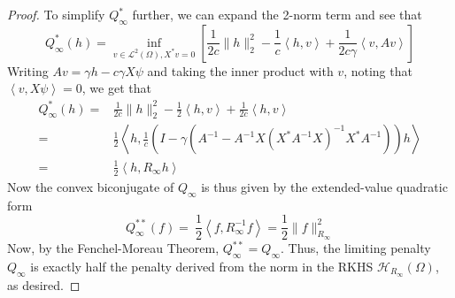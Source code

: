\documentclass[ejsv2,preprint]{imsart}
\newcommand{\inprod}[2]{\left\langle #1,#2\right\rangle}
\begin{document}
\begin{proof}
To simplify $Q^*_\infty$ further, we can expand the 2-norm term and see that
\begin{equation}
    Q^*_\infty(h) = \underset{v\in \mathcal{L}^2(\Omega), X^*v=0}{\inf} \left[\frac{1}{2c}\|h\|_2^2-\frac{1}{c}\inprod{h}{v}+\frac{1}{2c\gamma}\inprod{v}{Av}\right]
\end{equation}
Writing $Av=\gamma h-c\gamma X\psi$ and taking the inner product with $v$, noting that $\inprod{v}{X\psi}=0$, we get that
\begin{equation}
\begin{split}
    Q^*_\infty(h) =& \frac{1}{2c}\|h\|_2^2-\frac{1}{2}\inprod{h}{v}+\frac{1}{2c}\inprod{h}{v} \\
    =&\frac{1}{2}\inprod{h}{\frac{1}{c}
    \left(I-\gamma\left(A^{-1}-A^{-1}X(X^*A^{-1}X)^{-1}X^*A^{-1}\right)\right)h} \\
    =&\frac{1}{2}\inprod{h}{R_\infty h}
    \end{split}
\end{equation}
Now the convex biconjugate of $Q_\infty$ is thus given by the extended-value quadratic form
\begin{equation}
    Q^{**}_\infty(f) =\ \frac{1}{2}\inprod{f}{R_{\infty}^{-1}f} =\frac{1}{2}\|f\|^2_{R_\infty}
\end{equation}
Now, by the Fenchel-Moreau Theorem, $Q^{**}_\infty=Q_\infty$. Thus, the limiting penalty $Q_\infty$ is exactly half the penalty derived from the norm in the RKHS $\mathcal{H}_{R_\infty}(\Omega)$, as desired.
\end{proof}
\end{document}
